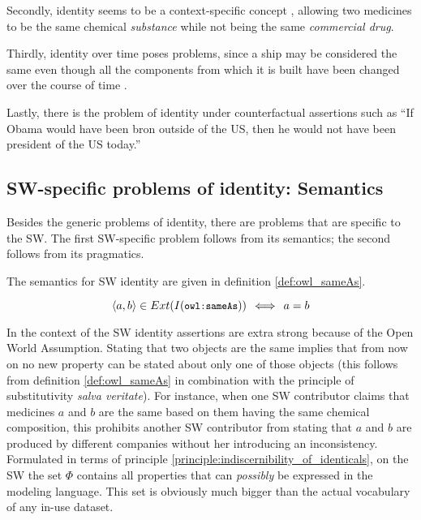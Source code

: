 Secondly, identity seems to be a context-specific concept \cite{Geach1967},
  allowing two medicines to be the same chemical \emph{substance}
  while not being the same \emph{commercial drug}.

Thirdly, identity over time poses problems,
  since a ship may be considered the same
  even though all the components from which it is built
  have been changed over the course of time \cite{Lewis1986}.

Lastly, there is the problem of identity under counterfactual assertions
  such as ``If Obama would have been bron outside of the US,
  then he would not have been president of the US today.''\cite{Kripke1980}

\subsection{SW-specific problems of identity: Semantics}

Besides the generic problems of identity,
  there are problems that are specific to the SW.
The first SW-specific problem follows from its semantics;
  the second follows from its pragmatics.

The semantics for SW identity are given in definition \ref{def:owl_sameAs}.

\begin{definition}
\label{def:owl_sameAs}
\begin{equation}
    \langle a, b \rangle \in Ext(I({\small \texttt{owl:sameAs}}))
  \,\iff\,
    a = b\nonumber
\end{equation}
\end{definition}

\noindent In the context of the SW identity assertions are extra strong
  because of the Open World Assumption.
Stating that two objects are the same
  implies that from now on no new property can be stated about
  only one of those objects
  (this follows from definition \ref{def:owl_sameAs} in combination with
  the principle of substitutivity \emph{salva veritate}).
For instance, when one SW contributor claims that
  medicines $a$ and $b$ are the same
  based on them having the same chemical composition,
  this prohibits another SW contributor from stating that
  $a$ and $b$ are produced by different companies
  without her introducing an inconsistency.
Formulated in terms of
  principle \ref{principle:indiscernibility_of_identicals},
  on the SW the set $\Phi$ contains
  all properties that can \emph{possibly} be expressed
  in the modeling language.
This set is obviously much bigger than the actual vocabulary
  of any in-use dataset.

